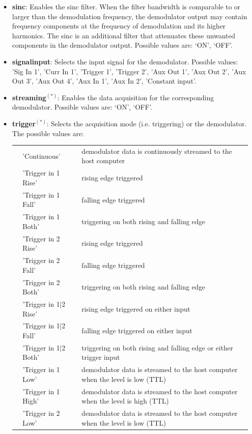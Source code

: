 \documentclass[11pt]{article} %
\begin{document}
\begin{itemize}
\begin{longtable}{p{1.5cm}p{3cm}p{12cm}}
	\end{longtable}
	\item {\bf sinc}: Enables the sinc filter. When the filter bandwidth is comparable to or larger than the demodulation frequency, the demodulator output may contain frequency components at the frequency of demodulation and its higher harmonics. The sinc is an additional filter that attenuates these unwanted components in the demodulator output. Possible values are: `ON', `OFF'.
	\item {\bf signalinput}: Selects the input signal for the demodulator. Possible values: 'Sig In 1', 'Curr In 1', 'Trigger 1', 'Trigger 2', 'Aux Out 1', 'Aux Out 2', 'Aux Out 3', 'Aux Out 4', 'Aux In 1', 'Aux In 2', 'Constant input'.
	\item {\bf streaming}$^{(*)}$: Enables the data acquisition for the corresponding demodulator. Possible values are: `ON', `OFF'.
	\item {\bf trigger}$^{(*)}$: Selects the acquisition mode (i.e. triggering) or the demodulator. The possible values are:
	\begin{longtable}{p{0.8cm}p{3.1cm}p{12.6cm}}
	&'Continuous' & demodulator data is continuously streamed to the host computer \\
	&'Trigger in 1 Rise' & rising edge triggered \\
	&'Trigger in 1 Fall' & falling edge triggered \\
	&'Trigger in 1 Both' & triggering on both rising and falling edge \\
	&'Trigger in 2 Rise' & rising edge triggered \\
	&'Trigger in 2 Fall' & falling edge triggered \\
	&'Trigger in 2 Both' & triggering on both rising and falling edge \\
	&'Trigger in 1$\mid$2 Rise' & rising edge triggered on either input \\
	&'Trigger in 1$\mid$2 Fall' & falling edge triggered on either input \\
	&'Trigger in 1$\mid$2 Both' & triggering on both rising and falling edge or either trigger input \\
	&'Trigger in 1 Low' & demodulator data is streamed to the host computer when the level is low (TTL) \\
	&'Trigger in 1 High' & demodulator data is streamed to the host computer when the level is high (TTL) \\
	&'Trigger in 2 Low' & demodulator data is streamed to the host computer when the level is low (TTL) \\

\end{longtable}
\end{itemize}
\end{document}
